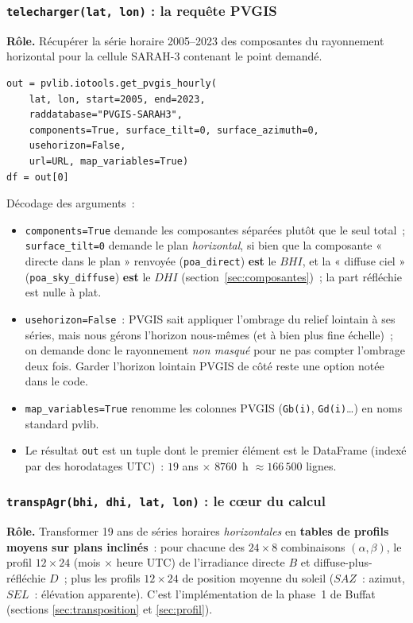 \documentclass[11pt,a4paper]{article}
\newcommand{\fichier}[1]{\texttt{#1}}
\newcommand{\fonction}[1]{\texttt{#1}}
\begin{document}
\subsubsection{\fonction{telecharger(lat, lon)} : la requête PVGIS}

\textbf{Rôle.} Récupérer la série horaire 2005--2023 des composantes du
rayonnement horizontal pour la cellule SARAH-3 contenant le point demandé.

\begin{lstlisting}
out = pvlib.iotools.get_pvgis_hourly(
    lat, lon, start=2005, end=2023,
    raddatabase="PVGIS-SARAH3",
    components=True, surface_tilt=0, surface_azimuth=0,
    usehorizon=False,
    url=URL, map_variables=True)
df = out[0]
\end{lstlisting}

Décodage des arguments~:
\begin{itemize}
  \item \fonction{components=True} demande les composantes séparées plutôt que
    le seul total~; \fonction{surface\_tilt=0} demande le plan
    \emph{horizontal}, si bien que la composante « directe dans le plan »
    renvoyée (\fonction{poa\_direct}) \textbf{est} le $BHI$, et la « diffuse
    ciel » (\fonction{poa\_sky\_diffuse}) \textbf{est} le $DHI$
    (section~\ref{sec:composantes})~; la part réfléchie est nulle à plat.
  \item \fonction{usehorizon=False}~: PVGIS sait appliquer l'ombrage du relief
    lointain à ses séries, mais nous gérons l'horizon nous-mêmes (et à bien plus
    fine échelle)~; on demande donc le rayonnement \emph{non masqué} pour ne pas
    compter l'ombrage deux fois. Garder l'horizon lointain PVGIS de côté reste
    une option notée dans le code.
  \item \fonction{map\_variables=True} renomme les colonnes PVGIS
    (\fichier{Gb(i)}, \fichier{Gd(i)}\ldots) en noms standard pvlib.
  \item Le résultat \fonction{out} est un tuple dont le premier élément est le
    DataFrame (indexé par des horodatages UTC)~: $19$ ans $\times$ $8760$~h
    $\approx 166\,500$ lignes.
\end{itemize}

\subsubsection{\fonction{transpAgr(bhi, dhi, lat, lon)} : le cœur du calcul}
\label{sec:transpAgr}

\textbf{Rôle.} Transformer 19 ans de séries horaires \emph{horizontales} en
\textbf{tables de profils moyens sur plans inclinés}~: pour chacune des
$24 \times 8$ combinaisons $(\alpha, \beta)$, le profil $12\times24$ (mois
$\times$ heure UTC) de l'irradiance directe $B$ et diffuse-plus-réfléchie $D$~;
plus les profils $12\times24$ de position moyenne du soleil ($SAZ$~: azimut,
$SEL$~: élévation apparente). C'est l'implémentation de la phase~1 de Buffat
(sections \ref{sec:transposition} et \ref{sec:profil}).
\end{document}

